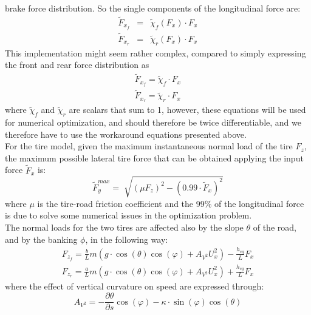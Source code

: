 \documentclass[a4paper, onecolumn, 12pt]{article}
\begin{document}
brake force distribution. So the single components of the longitudinal force are:
\begin{subequations}
    \begin{eqnarray}
        \tilde{F}_{x_f} &=& \tilde{\chi}_f(F_x) \cdot F_x \\
        \tilde{F}_{x_r} &=& \tilde{\chi}_r(F_x) \cdot F_x
    \end{eqnarray}
\end{subequations}
This implementation might seem rather complex, compared to simply expressing the front and rear force distribution as
\begin{subequations}
    \begin{eqnarray}
        \tilde{F}_{x_f} = \tilde{\chi}_f \cdot F_x \\
        \tilde{F}_{x_r} = \tilde{\chi}_r \cdot F_x
    \end{eqnarray}
\end{subequations}
where $\tilde{\chi}_f$ and $\tilde{\chi}_r$ are scalars that sum to 1, however, these equations will be used for numerical 
optimization, and should therefore be twice differentiable, and we therefore have to use the workaround equations presented above. \\
For the tire model, given the maximum instantaneous normal load of the tire $F_z$, the maximum possible
lateral tire force that can be obtained applying the input force $\tilde{F}_x$ is:
\begin{equation}
    \tilde{F}_y^{max} = \sqrt[]{(\mu F_z)^2 - (0.99\cdot \tilde{F}_x)^2}
\end{equation}
where $\mu$ is the tire-road friction coefficient and the 99\%  of the longitudinal force is due to solve 
some numerical issues in the optimization problem. \\
The normal loads for the two tires are affected also by the slope $\theta$ of the road, and by the banking $\phi$, in the following way:
\begin{subequations}
    \begin{eqnarray}
        \label{normal}
        F_{z_f} = \frac{b}{L}m(g\cdot \cos(\theta)\cos(\varphi)+A_{V^2}U_x^2)-\frac{h_{cg}}{L}F_x \\
        F_{z_r} = \frac{a}{L}m(g\cdot \cos(\theta)\cos(\varphi)+A_{V^2}U_x^2)+\frac{h_{cg}}{L}F_x
    \end{eqnarray}
\end{subequations}
where the effect of vertical curvature on speed are expressed through:
\begin{equation}
    A_{V^2} = -\frac{\partial \theta}{\partial s}\cos(\varphi)-\kappa\cdot \sin(\varphi)\cos(\theta) 
\end{equation}
\end{document}
